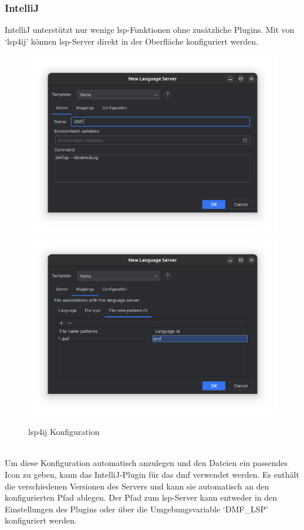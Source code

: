 \documentclass[./einleitung.tex]{subfiles}
\begin{document}
    \subsubsection{IntelliJ}
    IntelliJ unterstützt nur wenige \acrshort{lsp}-Funktionen ohne zusätzliche Plugins.
    Mit von `lsp4ij' können \acrshort{lsp}-Server direkt in der Oberfläche konfiguriert werden.\\
    \begin{figure}[H]
        \includegraphics[width=\linewidth / 2]{bilder/screenshot-add-lsp-lsp4ij}
        \includegraphics[width=\linewidth / 2]{bilder/screenshot-file-mapping}
        \caption{lsp4ij Konfiguration}
        \label{fig:screenshot-add-lsp-lsp4ij}
    \end{figure}\\
    Um diese Konfiguration automatisch anzulegen und den Dateien ein passendes Icon zu geben, kann das IntelliJ-Plugin für das \acrshort{dmf} verwendet werden.
    Es enthält die verschiedenen Versionen des Servers und kann sie automatisch an den konfigurierten Pfad ablegen.
    Der Pfad zum \acrshort{lsp}-Server kann entweder in den Einstellungen des Plugins oder über die Umgebungsvariable `DMF\_LSP' konfiguriert werden.
\end{document}
